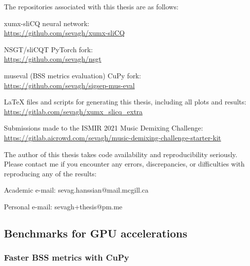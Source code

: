 \documentclass[report.tex]{subfiles}
\begin{document}
The repositories associated with this thesis are as follows:
\begin{tight_enumerate}
	\item
		xumx-sliCQ neural network:\\
		\url{https://github.com/sevagh/xumx-sliCQ}
	\item
		NSGT/sliCQT PyTorch fork:\\
		\url{https://github.com/sevagh/nsgt}
	\item
		museval (BSS metrics evaluation) CuPy fork:\\
		\url{https://github.com/sevagh/sigsep-mus-eval}
	\item
		LaTeX files and scripts for generating this thesis, including all plots and results:\\
		\url{https://gitlab.com/sevagh/xumx_slicq_extra}
	\item
		Submissions made to the ISMIR 2021 Music Demixing Challenge:\\
		\url{https://gitlab.aicrowd.com/sevagh/music-demixing-challenge-starter-kit}
\end{tight_enumerate}

The author of this thesis takes code availability and reproducibility seriously. Please contact me if you encounter any errors, discrepancies, or difficulties with reproducing any of the results:
\begin{tight_enumerate}
	\item
		Academic e-mail: sevag.hanssian@mail.mcgill.ca
	\item
		Personal e-mail: sevagh+thesis@pm.me
\end{tight_enumerate}

\subsection{Benchmarks for GPU accelerations}

\subsubsection{Faster BSS metrics with CuPy}
\end{document}
